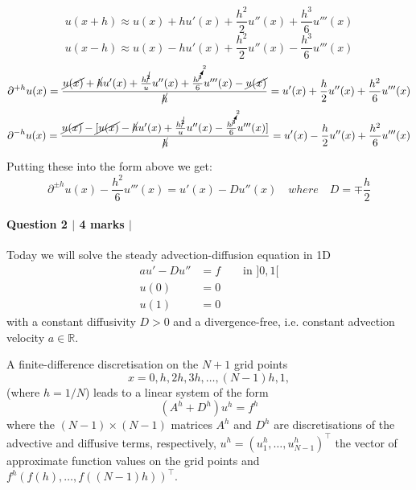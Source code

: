 \documentclass[10pt,letterpaper]{scrartcl}
\begin{document}
\begin{equation*}
    u(x+h) \approx u(x) + hu'(x) + \frac{h^2}{2} u''(x) + \frac{h^3}{6} u'''(x)
\end{equation*}
\begin{equation*}
    u(x-h) \approx u(x) - hu'(x) + \frac{h^2}{2} u''(x) - \frac{h^3}{6} u'''(x)
\end{equation*}
\begin{equation*}
    \partial^{+h}u(x) = \frac{\cancel{u(x)}+\cancel{h}u'(x)+\frac{h^{\cancel{2}}}{u}u''(x)+\frac{h^{\cancelto{2}{3}}}{6}u'''(x)-\cancel{u(x)}}{\cancel{h}} = u'(x)+\frac{h}{2}u''(x)+\frac{h^2}{6}u'''(x)
\end{equation*}
\begin{equation*}
    \partial^{-h}u(x) = \frac{\cancel{u(x)}-\cancel{[u(x)}-\cancel{h}u'(x)+\frac{h^{\cancel{2}}}{u}u''(x)-\frac{h^{\cancelto{2}{3}}}{6}u'''(x)]}{\cancel{h}} = u'(x)-\frac{h}{2}u''(x)+\frac{h^2}{6}u'''(x)
\end{equation*}

Putting these into the form above we get:
\begin{equation*}
    \partial^{\pm h}u(x) - \frac{h^2}{6}u'''(x) = u'(x) - Du''(x) \quad where \quad D = \mp \frac{h}{2}
\end{equation*}

\newpage

\paragraph*{Question 2 $\vert$ 4 marks $\vert$ \faFilePdfO}

Today we will solve the steady advection-diffusion equation in 1D
\begin{align*}
au' - D u'' &= f \qquad \text{in } ]0,1[\\
u(0) &= 0\\
u(1) &= 0
\end{align*}
with a constant diffusivity $D>0$ and a divergence-free, i.e. constant advection velocity $a \in \mathds{R}$.

A finite-difference discretisation on the $N+1$ grid points
\begin{equation*}
x = 0, h, 2h, 3h, \dots, (N-1)h, 1,
\end{equation*}
(where $h = 1/N$) leads to a linear system of the form
\begin{equation*}
\left( A^h + D^h \right) u^h = f^h
\end{equation*}
where the $(N-1) \times (N-1)$ matrices $A^h$ and $D^h$ are discretisations of the advective and diffusive terms, respectively, $u^h = (u^h_1, \dots , u^h_{N-1})^\top$ the vector of approximate function values on the grid points and $f^h (f(h), \dots , f((N-1)h))^\top$.
\end{document}
